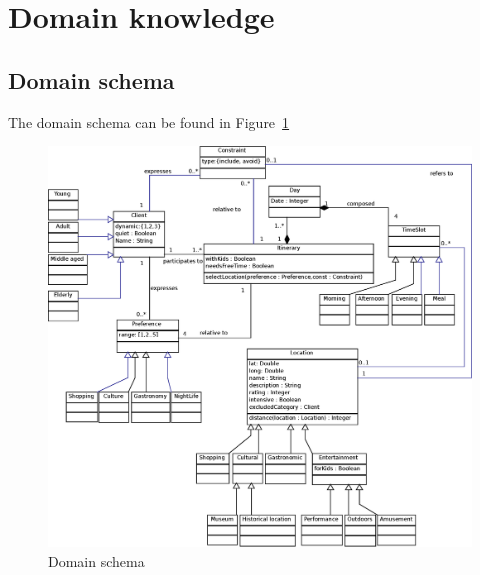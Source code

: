 \documentclass[11pt]{article} %
\begin{document}
\section{Domain knowledge}


\subsection{Domain schema}
The domain schema can be found in Figure~\ref{fig:ClassDiagram}

\begin{figure}[h]
\centering
\includegraphics[width=\textwidth]{images/domain.eps}
\caption{Domain schema}
\label{fig:ClassDiagram}
\end{figure}
\end{document}
